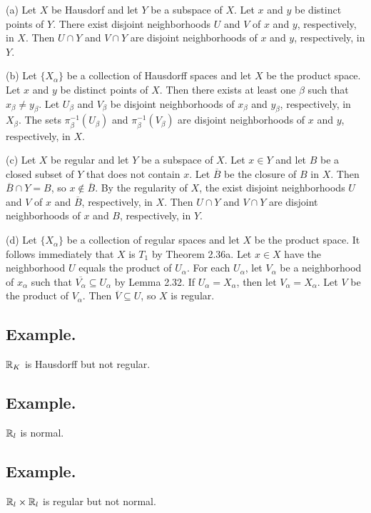 \documentclass[titlepage]{article}
\begin{document}
(a) Let $X$ be Hausdorf and let $Y$ be a subspace of $X$. Let $x$ and $y$ be distinct points of $Y$. There exist disjoint neighborhoods $U$ and $V$ of $x$ and $y$, respectively, in $X$. Then $U \cap Y$ and $V \cap Y$ are disjoint neighborhoods of $x$ and $y$, respectively, in $Y$.

(b) Let $\{X_{\alpha}\}$ be a collection of Hausdorff spaces and let $X$ be the product space. Let $x$ and $y$ be distinct points of $X$. Then there exists at least one $\beta$ such that $x_{\beta} \neq y_{\beta}$. Let $U_{\beta}$ and $V_{\beta}$ be disjoint neighborhoods of $x_{\beta}$ and $y_{\beta}$, respectively, in $X_{\beta}$. The sets $\pi_{\beta}^{-1}(U_{\beta})$ and $\pi_{\beta}^{-1}(V_{\beta})$ are disjoint neighborhoods of $x$ and $y$, respectively, in $X$.

(c) Let $X$ be regular and let $Y$ be a subspace of $X$. Let $x \in Y$ and let $B$ be a closed subset of $Y$ that does not contain $x$. Let $\overline{B}$ be the closure of $B$ in $X$. Then $\overline{B} \cap Y = B$, so $x \not\in \overline{B}$. By the regularity of $X$, the exist disjoint neighborhoods $U$ and $V$ of $x$ and $\overline{B}$, respectively, in $X$. Then $U \cap Y$ and $V \cap Y$ are disjoint neighborhoods of $x$ and $B$, respectively, in $Y$.

(d) Let $\{X_{\alpha}\}$ be a collection of regular spaces and let $X$ be the product space. It follows immediately that $X$ is $T_{1}$ by Theorem 2.36a. Let $x \in X$ have the neighborhood $U$ equals the product of $U_{\alpha}$. For each $U_{\alpha}$, let $V_{\alpha}$ be a neighborhood of $x_{\alpha}$ such that $\overline{V_{\alpha}} \subseteq U_{\alpha}$ by Lemma 2.32. If $U_{\alpha} = X_{\alpha}$, then let $V_{\alpha} = X_{\alpha}$. Let $V$ be the product of $V_{\alpha}$. Then $\overline{V} \subseteq U$, so $X$ is regular.

\subsection{Example.} $\mathbb{R}_{K}$ is Hausdorff but not regular.

\subsection{Example.} $\mathbb{R}_{l}$ is normal.

\subsection{Example.} $\mathbb{R}_{l} \times \mathbb{R}_{l}$ is regular but not normal.
\end{document}
